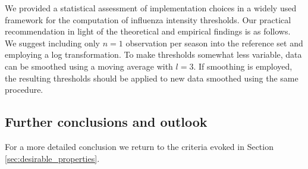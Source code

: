 \documentclass{article}
\begin{document}
We provided a statistical assessment of implementation choices in a widely used framework for the computation of influenza intensity thresholds. Our practical recommendation in light of the theoretical and empirical findings is as follows. We suggest including only $n = 1$ observation per season into the reference set and employing a log transformation. To make thresholds somewhat less variable, data can be smoothed using a moving average with $l = 3$. If smoothing is employed, the resulting thresholds should be applied to new data smoothed using the same procedure. %

\subsection{Further conclusions and outlook}

For a more detailed conclusion we return to the criteria evoked in Section \ref{sec:desirable_properties}.
\end{document}
